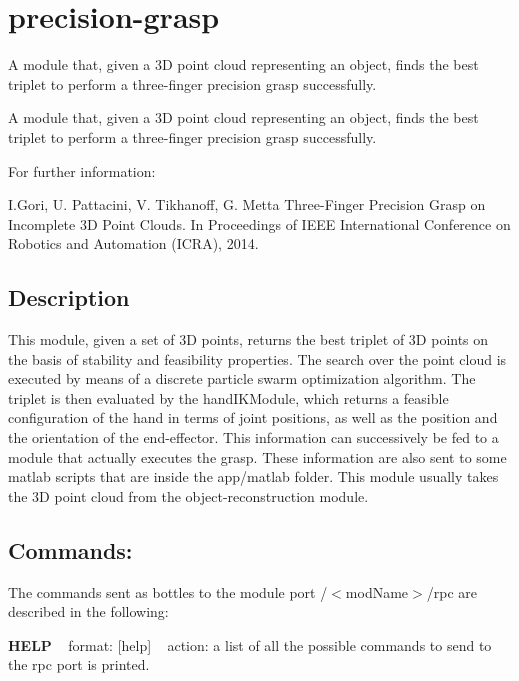 \section{precision-\/grasp}
\label{group__precision-grasp}


A module that, given a 3D point cloud representing an object, finds the best triplet to perform a three-\/finger precision grasp successfully.  


A module that, given a 3D point cloud representing an object, finds the best triplet to perform a three-\/finger precision grasp successfully. 

For further information\+:

I.\+Gori, U. Pattacini, V. Tikhanoff, G. Metta Three-\/\+Finger Precision Grasp on Incomplete 3D Point Clouds. In Proceedings of I\+E\+EE International Conference on Robotics and Automation (I\+C\+RA), 2014.\hypertarget{group__handIKModule_intro_sec}{}\subsection{Description}\label{group__handIKModule_intro_sec}
This module, given a set of 3D points, returns the best triplet of 3D points on the basis of stability and feasibility properties. The search over the point cloud is executed by means of a discrete particle swarm optimization algorithm. The triplet is then evaluated by the hand\+I\+K\+Module, which returns a feasible configuration of the hand in terms of joint positions, as well as the position and the orientation of the end-\/effector. This information can successively be fed to a module that actually executes the grasp. These information are also sent to some matlab scripts that are inside the app/matlab folder. This module usually takes the 3D point cloud from the object-\/reconstruction module.\hypertarget{group__handIKModule_rpc_port}{}\subsection{Commands\+:}\label{group__handIKModule_rpc_port}
The commands sent as bottles to the module port /$<$mod\+Name$>$/rpc are described in the following\+:

{\bfseries H\+E\+LP} ~\newline
format\+: \mbox{[}help\mbox{]} ~\newline
action\+: a list of all the possible commands to send to the rpc port is printed.

